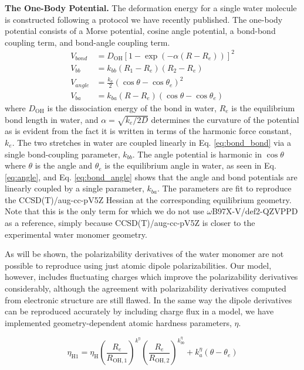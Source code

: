 \documentclass[journal=jctcce,manuscript=article]{achemso}
\begin{document}
\textbf{The One-Body Potential.} The deformation energy for a single water molecule is constructed following a protocol we have recently published.\cite{Sami2024} The one-body potential consists of a Morse potential, cosine angle potential, a bond-bond coupling term, and bond-angle coupling term.
\begin{align}
  \label{eq:morse}
  V_{bond}&=D_{\mathrm{OH}}\left[ 1-\exp(-\alpha (R-R_e))\right]^2 \\
  \label{eq:bond_bond}
  V_{bb}&=k_{bb}(R_1-R_e)(R_2-R_e) \\
  \label{eq:angle}
  V_{angle}&=\frac{k_a}{2}(\cos\theta-\cos\theta_e)^2 \\
  \label{eq:bond_angle}
  V_{ba}&=k_{ba}(R-R_e)(\cos\theta-\cos\theta_e)
\end{align}
where $D_{\mathrm{OH}}$ is the dissociation energy of the  bond in water, $R_e$ is the equilibrium bond length in water, and $\alpha=\sqrt{k_e/2D}$ determines the curvature of the potential as is evident from the fact it is written in terms of the harmonic force constant, $k_e$. The two  stretches in water are coupled linearly in Eq. \ref{eq:bond_bond} via a single bond-coupling parameter, $k_{bb}$. The angle potential is harmonic in $\cos\theta$ where $\theta$ is the  angle and $\theta_e$ is the equilibrium angle in water, as seen in Eq. \ref{eq:angle}, and  Eq. \ref{eq:bond_angle} shows that the angle and bond potentials are linearly coupled by a single parameter, $k_{ba}$. The parameters are fit to reproduce the CCSD(T)/aug-cc-pV5Z Hessian at the corresponding equilibrium geometry. Note that this is the only term for which we do not use $\omega$B97X-V/def2-QZVPPD as a reference, simply because CCSD(T)/aug-cc-pV5Z is closer to the experimental water monomer geometry.

As will be shown, the polarizability derivatives of the water monomer are not possible to reproduce using just atomic dipole polarizabilities. Our model, however, includes fluctuating charges which improve the polarizability derivatives considerably, although the agreement with polarizability derivatives computed from electronic structure are still flawed. In the same way the dipole derivatives can be reproduced accurately by including charge flux in a model\cite{liu2019implementation}, we have implemented geometry-dependent atomic hardness parameters, $\eta$.

\begin{equation}
  \eta_{\mathrm{H1}} = \eta_\mathrm{H} \left(\frac{R_e}{R_{\mathrm{OH,1}}}\right)^{k^\eta}\left(\frac{R_e}{R_{\mathrm{OH,2}}}\right)^{k^\eta_{bb}} + k^\eta_{a}(\theta - \theta_e)
  \label{eq:variable_hardness}
\end{equation}
\end{document}
